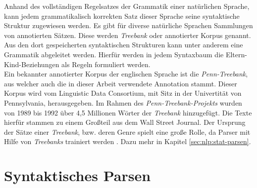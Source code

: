 Anhand des vollständigen Regelsatzes der Grammatik einer natürlichen Sprache, kann jedem grammatikalisch korrekten Satz dieser Sprache seine syntaktische Struktur zugewiesen werden. Es gibt für diverse natürliche Sprachen Sammlungen von annotierten Sätzen. Diese werden \textit{Treebank} oder annotierter Korpus genannt. Aus den dort gespeicherten syntaktischen Strukturen kann unter anderem eine Grammatik abgeleitet werden. Hierfür werden in jedem Syntaxbaum die Eltern-Kind-Beziehungen als Regeln formuliert werden.\\
Ein bekannter annotierter Korpus der englischen Sprache ist die \textit{Penn-Treebank}, aus welcher auch die in dieser Arbeit verwendete Annotation stammt. Dieser Korpus wird vom Linguistic Data Consortium, mit Sitz in der Univertität von Pennsylvania, herausgegeben. \cite{ldc} 
Im Rahmen des \textit{Penn-Treebank-Projekts} wurden von 1989 bis 1992 über 4,5 Millionen Wörter der \textit{Treebank} hinzugefügt. Die Texte hierfür stammen zu einem Großteil aus dem Wall Street Journal. Der Ursprung der Sätze einer \textit{Treebank}, bzw. deren Genre spielt eine große Rolle, da Parser mit Hilfe von \textit{Treebanks} trainiert werden \cite{ptbInformationen}. Dazu mehr in Kapitel \ref{sec:nlp:stat-parsen}. 

\section{Syntaktisches Parsen}
\label{sec:nlp:syn-parsen}

